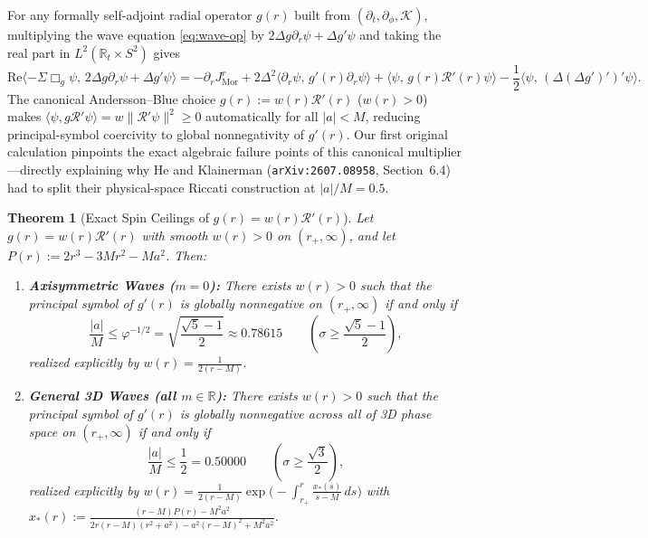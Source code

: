 \documentclass[11pt, a4paper]{article}
\newtheorem{theorem}{Theorem}[section]
\theoremstyle{remark}
\begin{document}
For any formally self-adjoint radial operator $g(r)$ built from $(\partial_t, \partial_\phi, \mathcal{K})$, multiplying the wave equation \eqref{eq:wave-op} by $2\Delta g\partial_r\psi + \Delta g'\psi$ and taking the real part in $L^2(\mathbb{R}_t \times S^2)$ gives
\begin{equation}
\label{eq:std-morawetz}
\mathrm{Re}\langle -\Sigma\Box_g\psi,\, 2\Delta g\partial_r\psi + \Delta g'\psi \rangle = -\partial_r J^r_{\mathrm{Mor}} + 2\Delta^2\langle\partial_r\psi,\, g'(r)\partial_r\psi\rangle + \langle\psi,\, g(r)\mathcal{R}'(r)\psi\rangle - \frac{1}{2}\langle\psi,\, (\Delta(\Delta g')')'\psi\rangle.
\end{equation}
The canonical Andersson--Blue choice $g(r) := w(r)\mathcal{R}'(r)$ ($w(r) > 0$) makes $\langle\psi, g\mathcal{R}'\psi\rangle = w\|\mathcal{R}'\psi\|^2 \ge 0$ automatically for all $|a| < M$, reducing principal-symbol coercivity to global nonnegativity of $g'(r)$. Our first original calculation pinpoints the exact algebraic failure points of this canonical multiplier---directly explaining why He and Klainerman (\texttt{arXiv:2607.08958}, Section~6.4) had to split their physical-space Riccati construction at $|a|/M = 0.5$.

\begin{theorem}[Exact Spin Ceilings of $g(r) = w(r)\mathcal{R}'(r)$]
\label{thm:ceilings}
Let $g(r) = w(r)\mathcal{R}'(r)$ with smooth $w(r) > 0$ on $(r_+, \infty)$, and let $P(r) := 2r^3 - 3Mr^2 - Ma^2$. Then:
\begin{enumerate}
\item \textbf{Axisymmetric Waves ($m = 0$):} There exists $w(r) > 0$ such that the principal symbol of $g'(r)$ is globally nonnegative on $(r_+, \infty)$ if and only if
\begin{equation}
\frac{|a|}{M} \le \varphi^{-1/2} = \sqrt{\frac{\sqrt{5}-1}{2}} \approx 0.78615 \qquad \left(\sigma \ge \frac{\sqrt{5}-1}{2}\right),
\end{equation}
realized explicitly by $w(r) = \frac{1}{2(r - M)}$.
\item \textbf{General 3D Waves (all $m \in \mathbb{R}$):} There exists $w(r) > 0$ such that the principal symbol of $g'(r)$ is globally nonnegative across all of 3D phase space on $(r_+, \infty)$ if and only if
\begin{equation}
\frac{|a|}{M} \le \frac{1}{2} = 0.50000 \qquad \left(\sigma \ge \frac{\sqrt{3}}{2}\right),
\end{equation}
realized explicitly by $w(r) = \frac{1}{2(r-M)}\exp\!\big(-\int_{r_+}^r \frac{x_*(s)}{s-M}\,ds\big)$ with $x_*(r) := \frac{(r-M)P(r) - M^2 a^2}{2r(r-M)(r^2+a^2) - a^2(r-M)^2 + M^2 a^2}$.
\end{enumerate}
\end{theorem}
\end{document}

